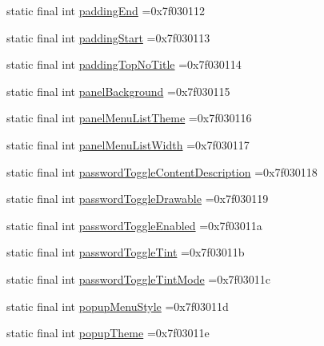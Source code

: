 \begin{DoxyCompactItemize}
\item 
static final int \mbox{\hyperlink{classbr_1_1unb_1_1cic_1_1mp_1_1marketmaster_1_1R_1_1attr_aeb0e4cbfbd8ea24ab6ecbdd27a736875}{padding\+End}} =0x7f030112
\item 
static final int \mbox{\hyperlink{classbr_1_1unb_1_1cic_1_1mp_1_1marketmaster_1_1R_1_1attr_ad172b1d51f60eaff3bd1692a740c80b1}{padding\+Start}} =0x7f030113
\item 
static final int \mbox{\hyperlink{classbr_1_1unb_1_1cic_1_1mp_1_1marketmaster_1_1R_1_1attr_a4af37874ab78dabad5bbba073b2a1dda}{padding\+Top\+No\+Title}} =0x7f030114
\item 
static final int \mbox{\hyperlink{classbr_1_1unb_1_1cic_1_1mp_1_1marketmaster_1_1R_1_1attr_a3560c6938e8ff5b49b4679c669c78a1d}{panel\+Background}} =0x7f030115
\item 
static final int \mbox{\hyperlink{classbr_1_1unb_1_1cic_1_1mp_1_1marketmaster_1_1R_1_1attr_a5e2647d94dd4b70074442e9590473f70}{panel\+Menu\+List\+Theme}} =0x7f030116
\item 
static final int \mbox{\hyperlink{classbr_1_1unb_1_1cic_1_1mp_1_1marketmaster_1_1R_1_1attr_a51453ffd50027501d741b22b41a5fcd7}{panel\+Menu\+List\+Width}} =0x7f030117
\item 
static final int \mbox{\hyperlink{classbr_1_1unb_1_1cic_1_1mp_1_1marketmaster_1_1R_1_1attr_ad3213dfc3dd8581704b074a9e249e3c2}{password\+Toggle\+Content\+Description}} =0x7f030118
\item 
static final int \mbox{\hyperlink{classbr_1_1unb_1_1cic_1_1mp_1_1marketmaster_1_1R_1_1attr_aa2724b54f50f5e166d651dbe6eb778ce}{password\+Toggle\+Drawable}} =0x7f030119
\item 
static final int \mbox{\hyperlink{classbr_1_1unb_1_1cic_1_1mp_1_1marketmaster_1_1R_1_1attr_a0a17ff71e5a2e9f87e35d6b6300eb740}{password\+Toggle\+Enabled}} =0x7f03011a
\item 
static final int \mbox{\hyperlink{classbr_1_1unb_1_1cic_1_1mp_1_1marketmaster_1_1R_1_1attr_a40551af69c99683bc04c0554746390ce}{password\+Toggle\+Tint}} =0x7f03011b
\item 
static final int \mbox{\hyperlink{classbr_1_1unb_1_1cic_1_1mp_1_1marketmaster_1_1R_1_1attr_a03bb8412d5fce55e0326cfb0c855a18c}{password\+Toggle\+Tint\+Mode}} =0x7f03011c
\item 
static final int \mbox{\hyperlink{classbr_1_1unb_1_1cic_1_1mp_1_1marketmaster_1_1R_1_1attr_a6272a79d38aba49fd3f0c25dca129e16}{popup\+Menu\+Style}} =0x7f03011d
\item 
static final int \mbox{\hyperlink{classbr_1_1unb_1_1cic_1_1mp_1_1marketmaster_1_1R_1_1attr_a49361846cb268f17bf7bf3808f343843}{popup\+Theme}} =0x7f03011e

\end{DoxyCompactItemize}
